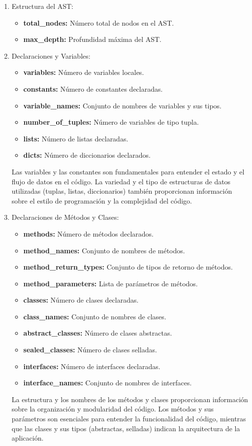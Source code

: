 \begin{enumerate}
	\item Estructura del AST:
    		\begin{itemize}
			\item {\bf total\_nodes:} Número total de nodos en el AST.
			\item {\bf max\_depth:} Profundidad máxima del AST.
		\end{itemize}
		
	 \item Declaraciones y Variables:
    \begin{itemize}
        \item {\bf variables:} Número de variables locales.
        \item {\bf constants:} Número de constantes declaradas.
        \item {\bf variable\_names:} Conjunto de nombres de variables y sus tipos.
        \item {\bf number\_of\_tuples:} Número de variables de tipo tupla.
        \item {\bf lists:} Número de listas declaradas.
        \item {\bf dicts:} Número de diccionarios declarados.
    \end{itemize}
    Las variables y las constantes son fundamentales para entender el estado y el flujo de datos en el código. La variedad y el tipo de estructuras de datos utilizadas (tuplas, listas, diccionarios) también proporcionan información sobre el estilo de programación y la complejidad del código.

    \item Declaraciones de Métodos y Clases:
    \begin{itemize}
        \item {\bf methods:} Número de métodos declarados.
        \item {\bf method\_names:} Conjunto de nombres de métodos.
        \item {\bf method\_return\_types:} Conjunto de tipos de retorno de métodos.
        \item {\bf method\_parameters:} Lista de parámetros de métodos.
        \item {\bf classes:} Número de clases declaradas.
        \item {\bf class\_names:} Conjunto de nombres de clases.
        \item {\bf abstract\_classes:} Número de clases abstractas.
        \item {\bf sealed\_classes:} Número de clases selladas.
        \item {\bf interfaces:} Número de interfaces declaradas.
        \item {\bf interface\_names:} Conjunto de nombres de interfaces.
    \end{itemize}
    La estructura y los nombres de los métodos y clases proporcionan información sobre la organización y modularidad del código. Los métodos y sus parámetros son esenciales para entender la funcionalidad del código, mientras que las clases y sus tipos (abstractas, selladas) indican la arquitectura de la aplicación.


\end{enumerate}
